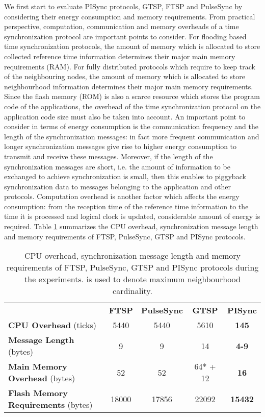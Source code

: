 \documentclass[english,a4paper,10pt,final]{article}
\numberwithin{equation}{section}
\numberwithin{figure}{section}
\begin{document}
We first start to evaluate PISync protocols, GTSP, FTSP and PulseSync by considering their energy consumption and memory requirements. From practical perspective, computation, communication and memory overheads of a time synchronization protocol are important points to consider. For flooding based time synchronization protocols, the amount of memory which is allocated to store collected reference time information determines their major main memory requirements (RAM). For fully distributed protocols which require to keep track of the neighbouring nodes, the amount of memory which is allocated to store neighbourhood information determines their major main memory requirements. Since the flash memory (ROM) is also a scarce resource which stores the program code of the applications, the overhead of the time synchronization protocol on the application code size must also be taken into account. An important point to consider in terms of energy consumption is the communication frequency and the length of the synchronization messages: in fact more frequent communication and longer synchronization messages give rise to higher energy consumption to transmit and receive these messages.  Moreover, if the length of the synchronization messages are short, i.e. the amount of information to be exchanged to achieve synchronization is small, then this enables to piggyback synchronization data to messages belonging to the application and other protocols. Computation overhead is another factor which affects the energy consumption: from the reception time of the reference time information to the time it is processed and logical clock is updated, considerable amount of energy is required. Table \ref{tab:Resource} summarizes the CPU overhead, synchronization message length and memory requirements of FTSP, PulseSync, GTSP and PISync protocols. 

\begin{table}
\center

\caption{CPU overhead, synchronization message length and memory requirements of FTSP, PulseSync, GTSP and PISync protocols during the experiments.  is used to denote maximum neighbourhood cardinality. \label{tab:Resource}}

\begin{tabular}{lcccc}
\multicolumn{1}{l}{} & \textbf{FTSP} & \textbf{PulseSync} & \textbf{GTSP} & \textbf{PISync} \\
\textbf{CPU Overhead }(ticks) & {\scriptsize  5440} & {\scriptsize  5440} & {\scriptsize  5610 } & {\bf \scriptsize  145 }\\
\textbf{Message Length} (bytes)& {\scriptsize 9  } & {\scriptsize 9  } & {\scriptsize 14 } & {\bf \scriptsize 4-9 }\\ 
\textbf{Main Memory Overhead} (bytes) & {\scriptsize 52  } & {\scriptsize 52 } & {\scriptsize 64{*} + 12} & {\bf \scriptsize 16}  \\
\textbf{Flash Memory Requirements} (bytes)& {\scriptsize {18000} } & {\scriptsize {17856} } & {\scriptsize {22092} } & \bf {\scriptsize {15432 }}\\ 
\end{tabular}

\end{table}
\end{document}

